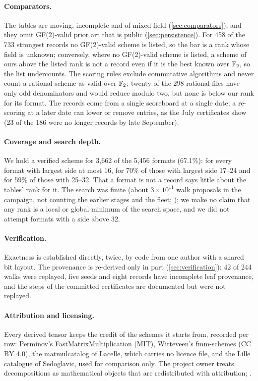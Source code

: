 \paragraph{Comparators.}
The tables are moving, incomplete and of mixed field (\cref{sec:comparators}), and they omit GF(2)-valid prior art that is public (\cref{sec:persistence}). For 458 of the 733 strongest records no GF(2)-valid scheme is listed, so the bar is a rank whose field is unknown; conversely, where no GF(2)-valid scheme is listed, a scheme of ours above the listed rank is not a record even if it is the best known over ${\mathbb{F}_2}$, so the list undercounts. The scoring rules exclude commutative algorithms and never count a rational scheme as valid over ${\mathbb{F}_2}$; twenty of the 298 rational files have only odd denominators and would reduce modulo two, but none is below our rank for its format.
The records come from a single scoreboard at a single date; a re-scoring at a later date can lower or remove entries, as the July certificates show (23 of the 186 were no longer records by late September).

\paragraph{Coverage and search depth.}
We hold a verified scheme for 3{,}662 of the 5{,}456 formats (67.1\%): for every format with largest side at most 16, for 70\% of those with largest side 17--24 and for 59\% of those with 25--32. That a format is not a record says little about the tables' rank for it. The search was finite (about $3\times10^{11}$ walk proposals in the campaign, not counting the earlier stages and the fleet; \cite{peterson2026methods}); we make no claim that any rank is a local or global minimum of the search space, and we did not attempt formats with a side above 32.

\paragraph{Verification.}
Exactness is established directly, twice, by code from one author with a shared bit layout. The provenance is re-derived only in part (\cref{sec:verification}): 42 of 244 walks were replayed, five seeds and eight records have incomplete leaf provenance, and the steps of the committed certificates are documented but were not replayed.

\paragraph{Attribution and licensing.}
Every derived tensor keeps the credit of the schemes it starts from, recorded per row: Perminov's FastMatrixMultiplication (MIT), Witteveen's fmm-schemes (CC BY 4.0), the matmulcatalog of Lacelle, which carries no licence file, and the Lille catalogue of Sedoglavic, used for comparison only.
The project owner treats decompositions as mathematical objects that are redistributed with attribution; .

